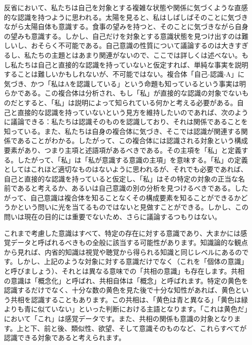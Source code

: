 \documentclass[a4paper,11pt,openany]{ltjsbook}
\begin{document}
反省において、私たちは自己を対象とする複雑な状態や関係に気づくような直感的な認識を持つように思われる。太陽を見ると、私はしばしばそのことに気づきながら太陽自体も意識する。食事の望みを持つと、そのことに気づきながら自身の望みも意識する。しかし、自己だけを対象とする意識状態を見つけ出すのは難しいし、おそらく不可能である。自己意識の性質について議論するのは大きすぎるし、私たちの主題とはあまり関連がないので、ここでは詳しくは述べない。もし私たちは自己と直接的な認識を持っていないと仮定すれば、単純な事実を説明することは難しいかもしれないが、不可能ではない。複合体「自己-認識-A」に気づき、かつ「私はAを認識している」という命題も知っているという事実は明らかである。この複合体は分析され、もし「私」が直接的な認識の対象でないものだとすると、「私」は説明によって知られている何かと考える必要がある。自己と直接的な認識を持っていないという見方を維持したいのであれば、次のように議論できる：私たちは認識そのものを認識しており、それは関係であることを知っている。また、私たちは自身の複合体に気づき、そこでは認識が関連する関係であることがわかる。したがって、この複合体には認識される対象という構成要素があり、つまり主項と述語項があるべきである。その主項を「私」と定義する。したがって、「私」は「私が意識する意識の主項」を意味する。「私」の定義としてはこれほど適切なものはないように思われるが、それでも必要であれば、自己と直接的な認識を持っていると仮定し、「私」はその特定の対象の正当な名前であると考えるか、あるいは自己意識の別の分析を見つけるべきである。したがって、自己意識は複合体を知ることなくその構成要素を知ることができるかどうかという問いに光を当てるものではないと見做すことができる。しかし、この問いは現在の目的には重要でないため、さらに議論するつもりはない。

これまで考慮した意識はすべて、特定の存在に対する意識であり、大まかには感覚データと呼ばれるべきもの全般に該当する可能性があります。知識論的な観点から見れば、内省的知識は視覚や聴覚から得られる知識と同じレベルにあるのです。しかし、上記のような対象に対する意識だけでなく（これを「個体の意識」と呼びましょう）、それとは異なる意味での「共相の意識」も存在します。共相の意識は「概念化」と呼ばれ、共相自体は「概念」と呼ばれます。特定の黄色を認識するだけでなく、十分な数の黄色を見た後で十分な知性があれば、黄色という共相を認識することもあります。この共相は、「黄色は青と異なる」「黄色は緑よりも青に似ていない」といった判断における主語となります。「これは黄色だ」において「これ」は感覚データです。また、共相の関係も意識の対象となります。上と下、前と後、類似性、欲望、そして意識そのものなど、これらすべてが認識できる対象であると考えられます。
\end{document}
